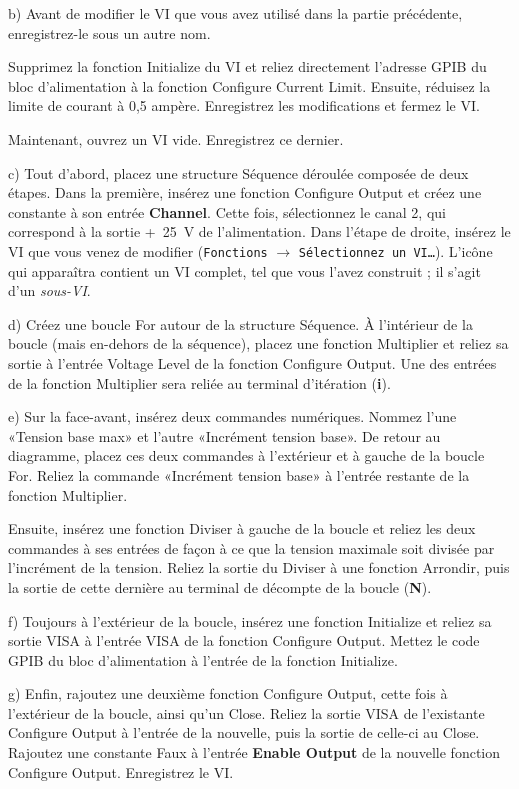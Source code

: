 \documentclass[canadien,12pt,oneside,letterpaper]{article}
\begin{document}
b) Avant de modifier le VI que vous avez utilisé dans la partie précédente, enregistrez-le sous un autre nom.

Supprimez la fonction Initialize du VI et reliez directement l'adresse GPIB du bloc d'alimentation à la fonction Configure Current Limit. Ensuite, réduisez la limite de courant à 0,5 ampère. Enregistrez les modifications et fermez le VI.

Maintenant, ouvrez un VI vide. Enregistrez ce dernier.

c) Tout d'abord, placez une structure Séquence déroulée composée de deux étapes. Dans la première, insérez une fonction Configure Output et créez une constante à son entrée \textbf{Channel}. Cette fois, sélectionnez le canal 2, qui correspond à la sortie +~25~V de l'alimentation. Dans l'étape de droite, insérez le VI que vous venez de modifier (\texttt{Fonctions} $\rightarrow$ \texttt{Sélectionnez un VI\ldots}). L'icône qui apparaîtra contient un VI complet, tel que vous l'avez construit ; il s'agit d'un \textit{sous-VI}.

d) Créez une boucle For autour de la structure Séquence. À l'intérieur de la boucle (mais en-dehors de la séquence), placez une fonction Multiplier et reliez sa sortie à l'entrée Voltage Level de la fonction Configure Output. Une des entrées de la fonction Multiplier sera reliée au terminal d'itération (\textbf{i}).

e) Sur la face-avant, insérez deux commandes numériques. Nommez l'une «Tension base max» et l'autre «Incrément tension base». De retour au diagramme, placez ces deux commandes à l'extérieur et à gauche de la boucle For. Reliez la commande «Incrément tension base» à l'entrée restante de la fonction Multiplier.

Ensuite, insérez une fonction Diviser à gauche de la boucle et reliez les deux commandes à ses entrées de façon à ce que la tension maximale soit divisée par l'incrément de la tension. Reliez la sortie du Diviser à une fonction Arrondir, puis la sortie de cette dernière au terminal de décompte de la boucle (\textbf{N}).

f) Toujours à l'extérieur de la boucle, insérez une fonction Initialize et reliez sa sortie VISA à l'entrée VISA de la fonction Configure Output. Mettez le code GPIB du bloc d'alimentation à l'entrée de la fonction Initialize.

g) Enfin, rajoutez une deuxième fonction Configure Output, cette fois à l'extérieur de la boucle, ainsi qu'un Close. Reliez la sortie VISA de l'existante Configure Output à l'entrée de la nouvelle, puis la sortie de celle-ci au Close. Rajoutez une constante Faux à l'entrée \textbf{Enable Output} de la nouvelle fonction Configure Output. Enregistrez le VI.
\end{document}
